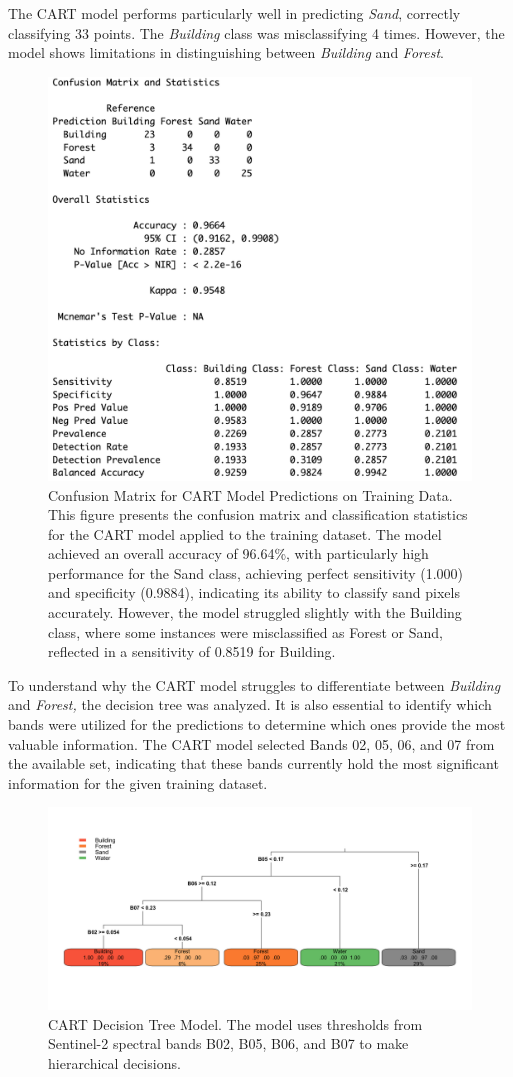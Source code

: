 \documentclass[a4paper,12pt]{article}
\begin{document}
The CART model performs particularly well in predicting \textit{Sand}, correctly classifying 33 points. The \textit{Building} class was misclassifying  4 times. However, the model shows limitations in distinguishing between \textit{Building} and \textit{Forest}.
\begin{figure}[H]
    \centering
    \includegraphics[width=0.5\linewidth]{CART_Model/CART TRAIN_CONF.png}
    \caption[Confusion Matrix for CART Model Predictions on Training Data]{Confusion Matrix for CART Model Predictions on Training Data. This figure presents the confusion matrix and classification statistics for the CART model applied to the training dataset. The model achieved an overall accuracy of 96.64\%, with particularly high performance for the Sand class, achieving perfect sensitivity (1.000) and specificity (0.9884), indicating its ability to classify sand pixels accurately. However, the model struggled slightly with the Building class, where some instances were misclassified as Forest or Sand, reflected in a sensitivity of 0.8519 for Building.}
    \label{fig:Cart accuracy}
\end{figure}
To understand why the CART model struggles to differentiate between \textit{Building} and \textit{Forest,} the decision tree was analyzed. It is also essential to identify which bands were utilized for the predictions to determine which ones provide the most valuable information.
The CART model selected Bands 02, 05, 06, and 07 from the available set, indicating that these bands currently hold the most significant information for the given training dataset.
\begin{figure}[H]
    \centering
    \includegraphics[width=0.75\linewidth]{CART_Model/CART on Training Data: Decision Tree.png.png}
    \caption[CART Decision Tree Model]{CART Decision Tree Model. The model uses thresholds from Sentinel-2 spectral bands B02, B05, B06, and B07 to make hierarchical decisions.}
    \label{fig:Cart Decisiontree}
\end{figure}
\end{document}
